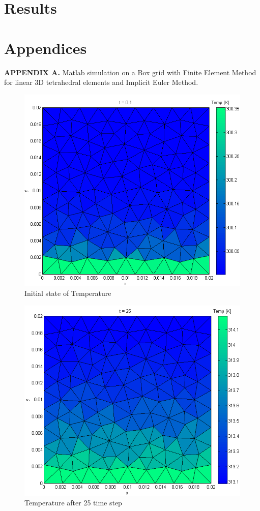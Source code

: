\documentclass[12pt]{article}
\begin{document}
	\section{Results}

	\section{Appendices}
	
	\textbf{APPENDIX A.} Matlab simulation on a Box grid with Finite Element Method for linear 3D tetrahedral elements and Implicit Euler Method.
	
	\begin{figure}[H]
    \includegraphics[scale=0.5]{matlab-results/1.png}
    \centering
    \caption{Initial state of Temperature}
	\end{figure}	
	\begin{figure}[H]
    \includegraphics[scale=0.5]{matlab-results/2.png}
    \centering
    \caption{Temperature after 25 time step}
	\end{figure}	
\end{document}
